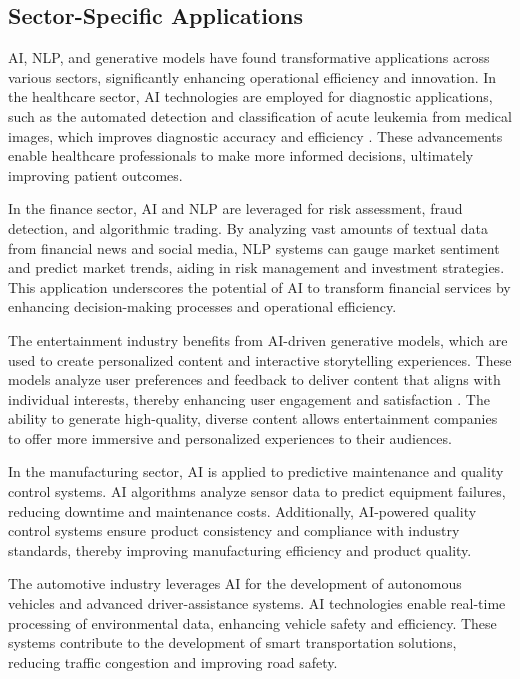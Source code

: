 \subsection{Sector-Specific Applications} \label{subsec:Sector-Specific Applications}



AI, NLP, and generative models have found transformative applications across various sectors, significantly enhancing operational efficiency and innovation. In the healthcare sector, AI technologies are employed for diagnostic applications, such as the automated detection and classification of acute leukemia from medical images, which improves diagnostic accuracy and efficiency \cite{zolfaghari2023surveyautomateddetectionclassification}. These advancements enable healthcare professionals to make more informed decisions, ultimately improving patient outcomes.



In the finance sector, AI and NLP are leveraged for risk assessment, fraud detection, and algorithmic trading. By analyzing vast amounts of textual data from financial news and social media, NLP systems can gauge market sentiment and predict market trends, aiding in risk management and investment strategies. This application underscores the potential of AI to transform financial services by enhancing decision-making processes and operational efficiency.



The entertainment industry benefits from AI-driven generative models, which are used to create personalized content and interactive storytelling experiences. These models analyze user preferences and feedback to deliver content that aligns with individual interests, thereby enhancing user engagement and satisfaction \cite{palmini2024patternscreativityuserinput}. The ability to generate high-quality, diverse content allows entertainment companies to offer more immersive and personalized experiences to their audiences.



In the manufacturing sector, AI is applied to predictive maintenance and quality control systems. AI algorithms analyze sensor data to predict equipment failures, reducing downtime and maintenance costs. Additionally, AI-powered quality control systems ensure product consistency and compliance with industry standards, thereby improving manufacturing efficiency and product quality.



The automotive industry leverages AI for the development of autonomous vehicles and advanced driver-assistance systems. AI technologies enable real-time processing of environmental data, enhancing vehicle safety and efficiency. These systems contribute to the development of smart transportation solutions, reducing traffic congestion and improving road safety.



